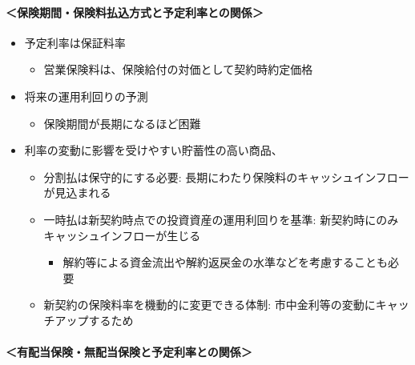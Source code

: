 \documentclass[
]{article}
\providecommand{\tightlist}{%
  \setlength{\itemsep}{0pt}\setlength{\parskip}{0pt}}
\begin{document}
\hypertarget{ux4fddux967aux671fux9593ux4fddux967aux6599ux6255ux8fbcux65b9ux5f0fux3068ux4e88ux5b9aux5229ux7387ux3068ux306eux95a2ux4fc2}{%
\paragraph{＜保険期間・保険料払込方式と予定利率との関係＞}\label{ux4fddux967aux671fux9593ux4fddux967aux6599ux6255ux8fbcux65b9ux5f0fux3068ux4e88ux5b9aux5229ux7387ux3068ux306eux95a2ux4fc2}}

\begin{itemize}
\tightlist
\item
  予定利率は保証料率

  \begin{itemize}
  \tightlist
  \item
    営業保険料は、保険給付の対価として契約時約定価格
  \end{itemize}
\item
  将来の運用利回りの予測

  \begin{itemize}
  \tightlist
  \item
    保険期間が長期になるほど困難
  \end{itemize}
\item
  利率の変動に影響を受けやすい貯蓄性の高い商品、

  \begin{itemize}
  \tightlist
  \item
    分割払は保守的にする必要:
    長期にわたり保険料のキャッシュインフローが見込まれる
  \item
    一時払は新契約時点での投資資産の運用利回りを基準:
    新契約時にのみキャッシュインフローが生じる

    \begin{itemize}
    \tightlist
    \item
      解約等による資金流出や解約返戻金の水準などを考慮することも必要
    \end{itemize}
  \item
    新契約の保険料率を機動的に変更できる体制:
    市中金利等の変動にキャッチアップするため
  \end{itemize}
\end{itemize}

\hypertarget{ux6709ux914dux5f53ux4fddux967aux7121ux914dux5f53ux4fddux967aux3068ux4e88ux5b9aux5229ux7387ux3068ux306eux95a2ux4fc2}{%
\paragraph{＜有配当保険・無配当保険と予定利率との関係＞}\label{ux6709ux914dux5f53ux4fddux967aux7121ux914dux5f53ux4fddux967aux3068ux4e88ux5b9aux5229ux7387ux3068ux306eux95a2ux4fc2}}
\end{document}
